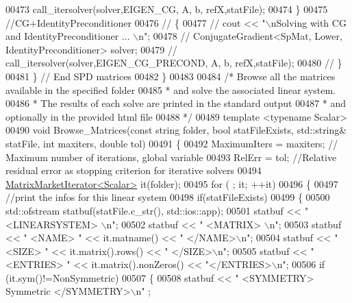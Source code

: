 \begin{DoxyCode}
00473       call\_itersolver(solver,EIGEN\_CG, A, b, refX,statFile);
00474     \}
00475     \textcolor{comment}{//CG+IdentityPreconditioner}
00476 \textcolor{comment}{//     \{}
00477 \textcolor{comment}{//       cout << "\(\backslash\)nSolving with CG and IdentityPreconditioner ... \(\backslash\)n"; }
00478 \textcolor{comment}{//       ConjugateGradient<SpMat, Lower, IdentityPreconditioner> solver; }
00479 \textcolor{comment}{//       call\_itersolver(solver,EIGEN\_CG\_PRECOND, A, b, refX,statFile);}
00480 \textcolor{comment}{//     \}}
00481   \} \textcolor{comment}{// End SPD matrices }
00482 \}
00483 
00484 \textcolor{comment}{/* Browse all the matrices available in the specified folder }
00485 \textcolor{comment}{ * and solve the associated linear system.}
00486 \textcolor{comment}{ * The results of each solve are printed in the standard output}
00487 \textcolor{comment}{ * and optionally in the provided html file}
00488 \textcolor{comment}{ */}
00489 \textcolor{keyword}{template} <\textcolor{keyword}{typename} Scalar>
00490 \textcolor{keywordtype}{void} Browse\_Matrices(\textcolor{keyword}{const} \textcolor{keywordtype}{string} folder, \textcolor{keywordtype}{bool} statFileExists, std::string& statFile, \textcolor{keywordtype}{int} maxiters, \textcolor{keywordtype}{double} 
      tol)
00491 \{
00492   MaximumIters = maxiters; \textcolor{comment}{// Maximum number of iterations, global variable }
00493   RelErr = tol;  \textcolor{comment}{//Relative residual error  as stopping criterion for iterative solvers}
00494   \hyperlink{class_eigen_1_1_matrix_market_iterator}{MatrixMarketIterator<Scalar>} it(folder);
00495   \textcolor{keywordflow}{for} ( ; it; ++it)
00496   \{
00497     \textcolor{comment}{//print the infos for this linear system }
00498     \textcolor{keywordflow}{if}(statFileExists)
00499     \{
00500       std::ofstream statbuf(statFile.c\_str(), std::ios::app);
00501       statbuf << \textcolor{stringliteral}{"<LINEARSYSTEM> \(\backslash\)n"};
00502       statbuf << \textcolor{stringliteral}{"   <MATRIX> \(\backslash\)n"};
00503       statbuf << \textcolor{stringliteral}{"     <NAME> "} << it.matname() << \textcolor{stringliteral}{" </NAME>\(\backslash\)n"}; 
00504       statbuf << \textcolor{stringliteral}{"     <SIZE> "} << it.matrix().rows() << \textcolor{stringliteral}{" </SIZE>\(\backslash\)n"}; 
00505       statbuf << \textcolor{stringliteral}{"     <ENTRIES> "} << it.matrix().nonZeros() << \textcolor{stringliteral}{"</ENTRIES>\(\backslash\)n"};
00506       \textcolor{keywordflow}{if} (it.sym()!=NonSymmetric)
00507       \{
00508         statbuf << \textcolor{stringliteral}{"     <SYMMETRY> Symmetric </SYMMETRY>\(\backslash\)n"} ; 

\end{DoxyCode}
